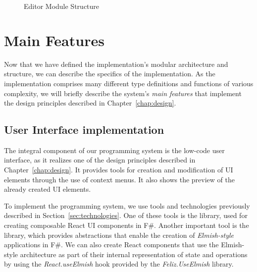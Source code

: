 \begin{figure}[H]
	\centering
	\caption{Editor Module Structure}
	\label{fig:editor-module-structure}
\end{figure}

\section{Main Features}
\label{sec:features}
Now that we have defined the implementation's modular architecture and structure, we can describe the specifics of the implementation.
As the implementation comprises many different type definitions and functions of various complexity,
we will briefly describe the system's \emph{main features} that implement the design principles described in Chapter~\ref{chap:design}.


\subsection{User Interface implementation}
The integral component of our programming system is the low-code user interface, as it realizes one of the design principles described in Chapter~\ref{chap:design}.
It provides tools for creation and modification of UI elements through the use of context menus.
It also shows the preview of the already created UI elements.

To implement the programming system, we use tools and technologies previously described in Section~\ref{sec:technologies}.
One of these tools is the \citet{feliz} library, used for creating composable React UI components in F\#.
Another important tool is the \citet{elmish} library, which provides abstractions that enable the creation of \emph{Elmish-style} applications in F\#.
We can also create React components that use the Elmish-style architecture as part of their internal representation of state and operations
by using the \emph{React.useElmish} hook provided by the \emph{Feliz.UseElmish} library.

